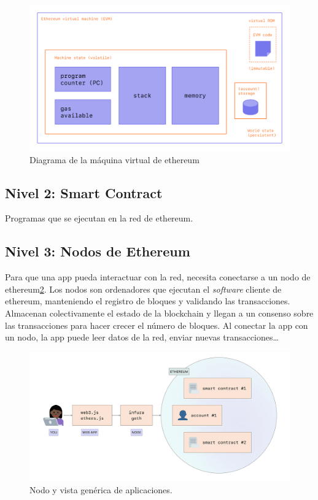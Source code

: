 \begin{figure}[h!]
  \centering
  \includegraphics[width=0.8\linewidth]{figs/EstadoArte/Ethereum/evm}
  \caption[Diagrama EVM]{Diagrama de la máquina virtual de ethereum}
  \label{fig:evm}
\end{figure}

\subsection{Nivel 2: Smart Contract} 

Programas que se ejecutan en la red de ethereum. 

\subsection{Nivel 3: Nodos de Ethereum}

Para que una app pueda interactuar con la red, necesita conectarse a un nodo de ethereum\ref{fig:etherNodo}. Los nodos son ordenadores que ejecutan el \emph{software} cliente de ethereum, manteniendo el registro de bloques y validando las transacciones. Almacenan colectivamente el estado de la blockchain y llegan a un consenso sobre las transacciones para hacer crecer el número de bloques. Al conectar la app con un nodo, la app puede leer datos de la red, enviar nuevas transacciones\dots

\begin{figure}[h!]
  \centering
  \includegraphics[width=0.8\linewidth]{figs/EstadoArte/Ethereum/ethereumNodo}
  \caption[Nodos vista genérica]{Nodo y vista genérica de aplicaciones.}
  \label{fig:etherNodo}
\end{figure}

